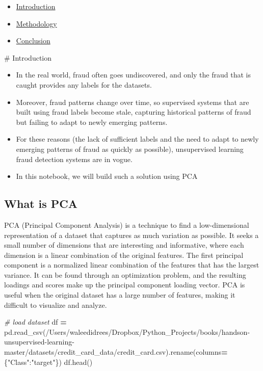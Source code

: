 \documentclass[
]{article}
\newenvironment{Shaded}{\begin{snugshade}}{\end{snugshade}}
\newcommand{\CommentTok}[1]{\textcolor[rgb]{0.56,0.35,0.01}{\textit{#1}}}
\newcommand{\NormalTok}[1]{#1}
\newcommand{\OperatorTok}[1]{\textcolor[rgb]{0.81,0.36,0.00}{\textbf{#1}}}
\newcommand{\StringTok}[1]{\textcolor[rgb]{0.31,0.60,0.02}{#1}}
\begin{document}
\begin{itemize}
\item
  \protect\hyperlink{1}{Introduction}
\item
  \protect\hyperlink{2}{Methodology}
\item
  \protect\hyperlink{5}{Conclusion}
\end{itemize}

\# Introduction

\begin{itemize}
\item
  In the real world, fraud often goes undiscovered, and only the fraud
  that is caught provides any labels for the datasets.
\item
  Moreover, fraud patterns change over time, so supervised systems that
  are built using fraud labels become stale, capturing historical
  patterns of fraud but failing to adapt to newly emerging patterns.
\item
  For these reasons (the lack of sufficient labels and the need to adapt
  to newly emerging patterns of fraud as quickly as possible),
  unsupervised learning fraud detection systems are in vogue.
\item
  In this notebook, we will build such a solution using PCA
\end{itemize}

\hypertarget{what-is-pca}{%
\subsection{What is PCA}\label{what-is-pca}}

PCA (Principal Component Analysis) is a technique to find a
low-dimensional representation of a dataset that captures as much
variation as possible. It seeks a small number of dimensions that are
interesting and informative, where each dimension is a linear
combination of the original features. The first principal component is a
normalized linear combination of the features that has the largest
variance. It can be found through an optimization problem, and the
resulting loadings and scores make up the principal component loading
vector. PCA is useful when the original dataset has a large number of
features, making it difficult to visualize and analyze.

\begin{Shaded}
\begin{Highlighting}[]
\CommentTok{\# load dataset}
\NormalTok{df }\OperatorTok{=}\NormalTok{ pd.read\_csv(}\StringTok{\textquotesingle{}/Users/waleedidrees/Dropbox/Python\_Projects/books/handson{-}unsupervised{-}learning{-}master/datasets/credit\_card\_data/credit\_card.csv\textquotesingle{}}\NormalTok{).rename(columns}\OperatorTok{=}\NormalTok{ \{}\StringTok{"Class"}\NormalTok{:}\StringTok{"target"}\NormalTok{\})}
\NormalTok{df.head()}
\end{Highlighting}
\end{Shaded}
\end{document}
